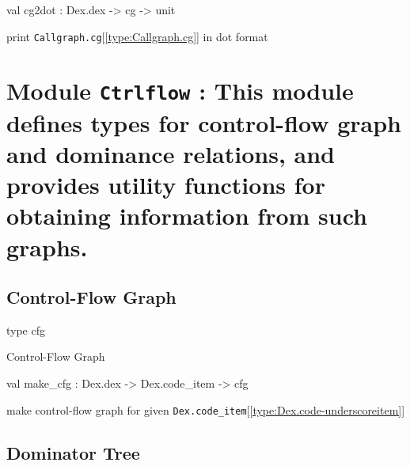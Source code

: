 \documentclass[11pt]{article}
\begin{document}
\label{val:Callgraph.cg2dot}\begin{ocamldoccode}
val cg2dot : Dex.dex -> cg -> unit
\end{ocamldoccode}
\begin{ocamldocdescription}
print {\tt{Callgraph.cg}}[\ref{type:Callgraph.cg}] in dot format


\end{ocamldocdescription}


\section{Module {\tt{Ctrlflow}} : This module defines types for control-flow graph and dominance relations,
 and provides utility functions for obtaining information from such graphs.}
\label{module:Ctrlflow}




\ocamldocvspace{0.5cm}



\subsection{Control-Flow Graph}




\label{type:Ctrlflow.cfg}\begin{ocamldoccode}
type cfg 
\end{ocamldoccode}
\begin{ocamldocdescription}
Control-Flow Graph


\end{ocamldocdescription}




\label{val:Ctrlflow.make-underscorecfg}\begin{ocamldoccode}
val make_cfg : Dex.dex -> Dex.code_item -> cfg
\end{ocamldoccode}
\begin{ocamldocdescription}
make control-flow graph for given {\tt{Dex.code\_item}}[\ref{type:Dex.code-underscoreitem}]


\end{ocamldocdescription}




\subsection{Dominator Tree}
\end{document}
